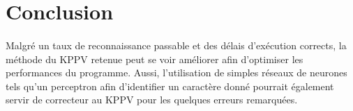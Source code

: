\section{Conclusion}

\paragraph{}
Malgré un taux de reconnaissance passable et des délais d'exécution corrects, la méthode du KPPV retenue peut se voir améliorer afin d'optimiser les performances du programme. Aussi, l'utilisation de simples réseaux de neurones tels qu'un perceptron afin d'identifier un caractère donné pourrait également servir de correcteur au KPPV pour les quelques erreurs remarquées.
